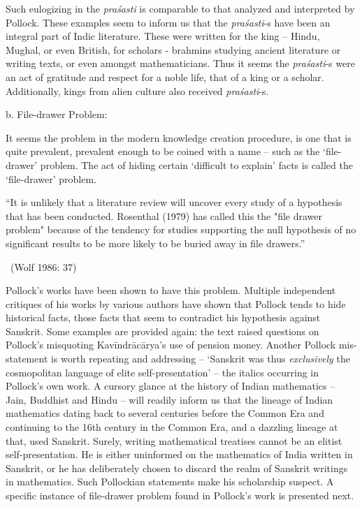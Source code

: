 Such eulogizing in the \textit{praśasti} is comparable to that analyzed and interpreted by Pollock. These examples seem to inform us that the \textit{praśasti}-s have been an integral part of Indic literature. These were written for the king – Hindu, Mughal, or even British, for scholars - brahmins studying ancient literature or writing texts, or even amongst mathematicians. Thus it seems the \textit{praśasti}-s were an act of gratitude and respect for a noble life, that of a king or a scholar. Additionally, kings from alien culture also received \textit{praśasti}-s.

b. File-drawer Problem:

It seems the problem in the modern knowledge creation procedure, is one that is quite prevalent, prevalent enough to be coined with a name – such as the ‘file-drawer’ problem. The act of hiding certain ‘difficult to explain’ facts is called the ‘file-drawer’ problem.

\begin{myquote}
“It is unlikely that a literature review will uncover every study of a hypothesis that has been conducted. Rosenthal (1979) has called this the "file drawer problem" because of the tendency for studies supporting the null hypothesis of no significant results to be more likely to be buried away in file drawers.” 

~\hfill (Wolf 1986: 37)
\end{myquote}

Pollock’s works have been shown to have this problem. Multiple independent critiques of his works by various authors have shown that Pollock tends to hide historical facts, those facts that seem to contradict his hypothesis against Sanskrit. Some examples are provided again: the text raised questions on Pollock’s misquoting Kavīndrācārya’s use of pension money. Another Pollock mis-statement is worth repeating and addressing – ‘Sanskrit was thus \textit{exclusively} the cosmopolitan language of elite self-presentation’ – the italics occurring in Pollock’s own work. A cursory glance at the history of Indian mathematics – Jain, Buddhist and Hindu – will readily inform us that the lineage of Indian mathematics dating back to several centuries before the Common Era and continuing to the 16th century in the Common Era, and a dazzling lineage at that, used Sanskrit. Surely, writing mathematical treatises cannot be an elitist self-presentation. He is either uninformed on the mathematics of India written in Sanskrit, or he has deliberately chosen to discard the realm of Sanskrit writings in mathematics. Such Pollockian statements make his scholarship suspect. A specific instance of file-drawer problem found in Pollock’s work is presented next.

